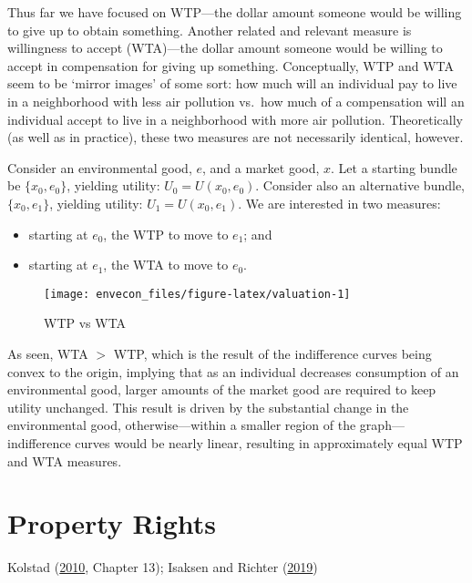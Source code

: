 \documentclass[
]{book}
\providecommand{\tightlist}{%
  \setlength{\itemsep}{0pt}\setlength{\parskip}{0pt}}
\begin{document}
Thus far we have focused on WTP---the dollar amount someone would be willing to give up to obtain something. Another related and relevant measure is willingness to accept (WTA)---the dollar amount someone would be willing to accept in compensation for giving up something.
Conceptually, WTP and WTA seem to be `mirror images' of some sort: how much will an individual pay to live in a neighborhood with less air pollution vs.~how much of a compensation will an individual accept to live in a neighborhood with more air pollution. Theoretically (as well as in practice), these two measures are not necessarily identical, however.

Consider an environmental good, \(e\), and a market good, \(x\). Let a starting bundle be \(\{x_0,e_0\}\), yielding utility: \(U_0 = U(x_0,e_0)\). Consider also an alternative bundle, \(\{x_0,e_1\}\), yielding utility: \(U_1 = U(x_0,e_1)\). We are interested in two measures:

\begin{itemize}
\tightlist
\item
  starting at \(e_0\), the WTP to move to \(e_1\); and
\item
  starting at \(e_1\), the WTA to move to \(e_0\).
\end{itemize}

\begin{figure}

{\centering \texttt{[image: envecon\_files/figure-latex/valuation-1]} 

}

\caption{WTP vs WTA}\label{fig:valuation}
\end{figure}

As seen, WTA \(>\) WTP, which is the result of the indifference curves being convex to the origin, implying that as an individual decreases consumption of an environmental good, larger amounts of the market good are required to keep utility unchanged. This result is driven by the substantial change in the environmental good, otherwise---within a smaller region of the graph---indifference curves would be nearly linear, resulting in approximately equal WTP and WTA measures.

\hypertarget{property-rights}{%
\chapter{Property Rights}\label{property-rights}}

Kolstad (\protect\hyperlink{ref-kolstad2010}{2010}, Chapter 13); Isaksen and Richter (\protect\hyperlink{ref-isaksen2019}{2019})
\end{document}

